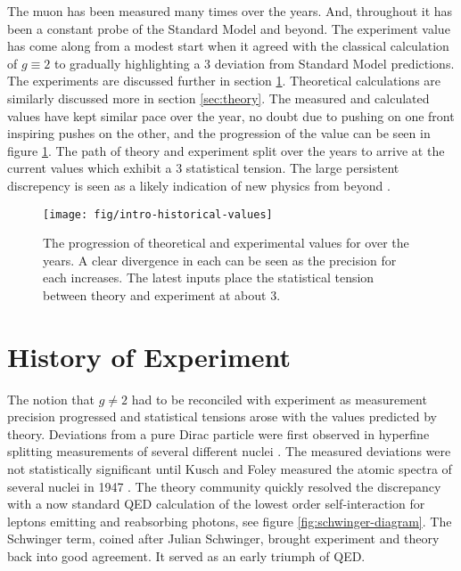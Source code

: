The muon \gmtwo has been measured many times over the years.  And, throughout it has been a constant probe of the Standard Model and beyond.  The experiment value has come along from a modest start when it agreed with the classical calculation of $g\equiv2$  to gradually highlighting a \SI{3}{\sigma} deviation from Standard Model predictions.  The experiments are discussed further in section \ref{sec:history-expt}.  Theoretical calculations are similarly discussed more in section \ref{sec:theory}.  The measured and calculated \mugmtwo values have kept similar pace over the year, no doubt due to pushing on one front inspiring pushes on the other, and the progression of the value can be seen in figure \ref{fig:intro-historical-values}.  The path of theory and experiment split over the years to arrive at the current values which exhibit a \SI{3}{\sigma} statistical tension.  The large persistent discrepency is seen as a likely indication of new physics from beyond \tsm.

\begin{figure}
\label{fig:intro-historical-values}
\texttt{[image: fig/intro-historical-values]}
\caption{The progression of theoretical and experimental values for \mugmtwo over the years.  A clear divergence in each can be seen as the precision for each increases.  The latest inputs place the statistical tension between theory and experiment at about \SI{3}{\sigma}.}
\end{figure}

\section{History of Experiment} \label{sec:history-expt}

The notion that $g \ne 2$ had to be reconciled with experiment as measurement precision progressed and statistical tensions arose with the values predicted by theory.  Deviations from a pure Dirac particle were first observed in hyperfine splitting measurements of several different nuclei .  The measured deviations were not statistically significant until Kusch and Foley measured the atomic spectra of several nuclei in 1947 \cite{kusch-foley}.  The theory community quickly resolved the discrepancy with a now standard QED calculation of the lowest order self-interaction for leptons emitting and reabsorbing photons, see figure \ref{fig:schwinger-diagram}.  The Schwinger term, coined after Julian Schwinger, brought experiment and theory back into good agreement.  It served as an early triumph of QED. 


